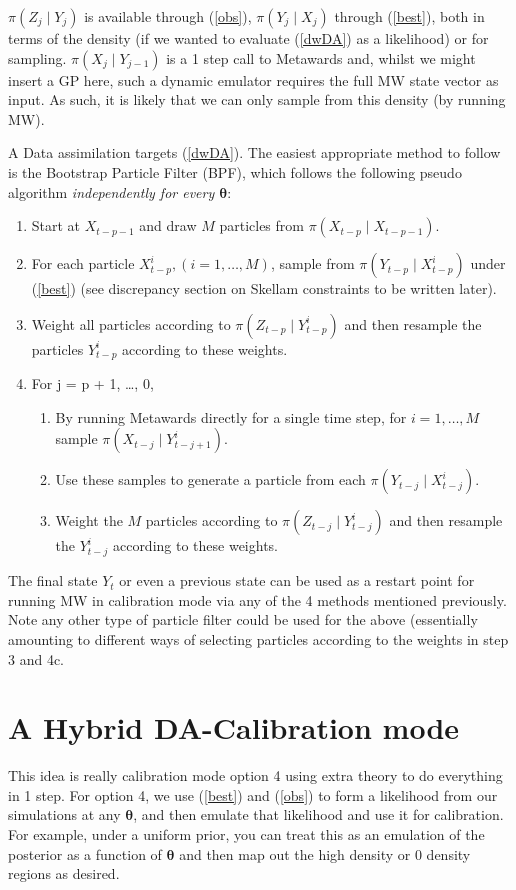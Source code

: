 \documentclass[a4paper]{article}
\newcommand{\btheta}{\bm{\theta}}
\begin{document}
$\pi\left(Z_j \mid Y_j\right)$ is available through (\ref{obs}), $\pi\left(Y_j \mid X_j\right)$ through (\ref{best}), both in terms of the density (if we wanted to evaluate (\ref{dwDA}) as a likelihood) or for sampling. $\pi\left(X_j \mid Y_{j - 1}\right)$ is a 1 step call to Metawards and, whilst we might insert a GP here, such a dynamic emulator requires the full MW state vector as input. As such, it is likely that we can only sample from this density (by running MW). 

A Data assimilation targets (\ref{dwDA}). The easiest appropriate method to follow is the Bootstrap Particle Filter (BPF), which follows the following pseudo algorithm \textit{independently for every $\btheta$}:
\begin{enumerate}
\item Start at $X_{t-p-1}$ and draw $M$ particles from $\pi(X_{t-p}\mid X_{t-p-1})$.
\item For each particle $X^i_{t-p}, (i=1, \ldots, M)$, sample from $\pi\left(Y_{t-p} \mid X^i_{t-p}\right)$ under (\ref{best}) (see discrepancy section on Skellam constraints to be written later).
\item Weight all particles according to $\pi\left(Z_{t-p} \mid Y^{i}_{t-p}\right)$ and then resample the particles $Y^i_{t-p}$ according to these weights.
\item For j = p + 1, \ldots, 0, 
\begin{enumerate}
\item By running Metawards directly for a single time step, for $i = 1, \ldots, M$ sample $\pi\left(X_{t-j} \mid Y^i_{t- j + 1}\right)$.
\item Use these samples to generate a particle from each $\pi\left(Y_{t-j} \mid X^i_{t-j}\right)$.
\item Weight the $M$ particles according to $\pi\left(Z_{t-j} \mid Y^{i}_{t-j}\right)$ and then resample the $Y^i_{t-j}$ according to these weights.
\end{enumerate}
\end{enumerate}

The final state $Y_t$ or even a previous state can be used as a restart point for running MW in calibration mode via any of the 4 methods mentioned previously. Note any other type of particle filter could be used for the above (essentially amounting to different ways of selecting particles according to the weights in step 3 and 4c.

\section*{A Hybrid DA-Calibration mode}
This idea is really calibration mode option 4 using extra theory to do everything in 1 step. For option 4, we use (\ref{best}) and (\ref{obs}) to form a likelihood from our simulations at any $\btheta$, and then emulate that likelihood and use it for calibration. For example, under a uniform prior, you can treat this as an emulation of the posterior as a function of $\btheta$ and then map out the high density or 0 density regions as desired. 
\end{document}
